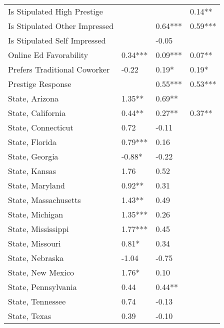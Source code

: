 \begin{table}
\begin{center}
\begin{tabular}{llll}
            Is Stipulated High Prestige        &         &          & 0.14**   \\
            Is Stipulated Other Impressed      &         & 0.64***  & 0.59***  \\
            Is Stipulated Self Impressed       &         & -0.05    &          \\
            Online Ed Favorability             & 0.34*** & 0.09***  & 0.07**   \\
            Prefers Traditional Coworker       & -0.22   & 0.19*    & 0.19*    \\
            Prestige Response                  &         & 0.55***  & 0.53***  \\
            State, Arizona                     & 1.35**  & 0.69**   &          \\
            State, California                  & 0.44**  & 0.27**   & 0.37**   \\
            State, Connecticut                 & 0.72    & -0.11    &          \\
            State, Florida                     & 0.79*** & 0.16     &          \\
            State, Georgia                     & -0.88*  & -0.22    &          \\
            State, Kansas                      & 1.76    & 0.52     &          \\
            State, Maryland                    & 0.92**  & 0.31     &          \\
            State, Massachusetts               & 1.43**  & 0.49     &          \\
            State, Michigan                    & 1.35*** & 0.26     &          \\
            State, Mississippi                 & 1.77*** & 0.45     &          \\
            State, Missouri                    & 0.81*   & 0.34     &          \\
            State, Nebraska                    & -1.04   & -0.75    &          \\
            State, New Mexico                  & 1.76*   & 0.10     &          \\
            State, Pennsylvania                & 0.44    & 0.44**   &          \\
            State, Tennessee                   & 0.74    & -0.13    &          \\
            State, Texas                       & 0.39    & -0.10    &          \\

\end{tabular}
\end{center}
\end{table}
